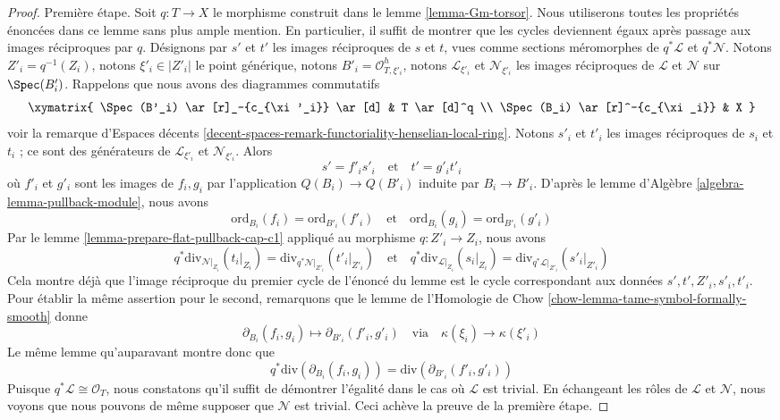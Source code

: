\begin{proof}
\medskip\noindent
Première étape. Soit $q : T \to X$ le morphisme construit dans le lemme
\ref{lemma-Gm-torsor}. Nous utiliserons toutes les propriétés énoncées dans ce
lemme sans plus ample mention. En particulier, il suffit de montrer que les cycles
deviennent égaux après passage aux images réciproques par $q$. Désignons par $s'$ et $t'$ les images réciproques de $s$ et
$t$, vues comme sections méromorphes de $q^*\mathcal{L}$ et $q^*\mathcal{N}$.
Notons $Z'_i = q^{-1}(Z_i)$, notons $\xi'_i \in |Z'_i|$ le point générique,
notons $B'_i = \mathcal{O}_{T, \xi'_i}^h$, notons $\mathcal{L}_{\xi'_i}$ et
$\mathcal{N}_{\xi'_i}$ les images réciproques de $\mathcal{L}$ et $\mathcal{N}$ sur
$\Spec(B'_i)$. Rappelons que nous avons des diagrammes commutatifs
$$
\xymatrix{
\Spec(B'_i) \ar[r]_-{c_{\xi'_i}} \ar[d] & T \ar[d]^q \\
\Spec(B_i) \ar[r]^-{c_{\xi_i}} & X
}
$$
voir la remarque d'Espaces décents
\ref{decent-spaces-remark-functoriality-henselian-local-ring}. Notons $s'_i$
et $t'_i$ les images réciproques de $s_i$ et $t_i$ ; ce sont des générateurs de
$\mathcal{L}_{\xi'_i}$ et $\mathcal{N}_{\xi'_i}$. Alors
$$
s' = f'_i s'_i
\quad\text{et}\quad
t' = g'_i t'_i
$$
où $f'_i$ et $g'_i$ sont les images de $f_i, g_i$ par l'application $Q(B_i) \to
Q(B'_i)$ induite par $B_i \to B'_i$. D'après le lemme d'Algèbre
\ref{algebra-lemma-pullback-module}, nous avons
$$
\text{ord}_{B_i}(f_i) = \text{ord}_{B'_i}(f'_i)
\quad\text{et}\quad
\text{ord}_{B_i}(g_i) = \text{ord}_{B'_i}(g'_i)
$$
Par le lemme \ref{lemma-prepare-flat-pullback-cap-c1} appliqué au morphisme $q : Z'_i \to
Z_i$, nous avons
$$
q^*\text{div}_{\mathcal{N}|_{Z_i}}(t_i|_{Z_i}) =
\text{div}_{q^*\mathcal{N}|_{Z'_i}}(t'_i|_{Z'_i})
\quad\text{et}\quad
q^*\text{div}_{\mathcal{L}|_{Z_i}}(s_i|_{Z_i}) =
\text{div}_{q^*\mathcal{L}|_{Z'_i}}(s'_i|_{Z'_i})
$$
Cela montre déjà que l'image réciproque du premier cycle de l'énoncé du lemme
est le cycle correspondant aux données $s', t', Z'_i, s'_i, t'_i$. Pour établir
la même assertion pour le second, remarquons que le lemme de l'Homologie de Chow
\ref{chow-lemma-tame-symbol-formally-smooth} donne
$$
\partial_{B_i}(f_i, g_i) \mapsto
\partial_{B'_i}(f'_i, g'_i)
\quad\text{via}\quad
\kappa(\xi_i) \to \kappa(\xi'_i)
$$
Le même lemme qu'auparavant montre donc que
$$
q^*\text{div}(\partial_{B_i}(f_i, g_i)) =
\text{div}(\partial_{B'_i}(f'_i, g'_i))
$$
Puisque $q^*\mathcal{L} \cong \mathcal{O}_T$, nous constatons qu'il suffit de
démontrer l'égalité dans le cas où $\mathcal{L}$ est trivial. En échangeant les
rôles de $\mathcal{L}$ et $\mathcal{N}$, nous voyons que nous pouvons de même
supposer que $\mathcal{N}$ est trivial. Ceci achève la preuve de la
première étape.


\end{proof}
